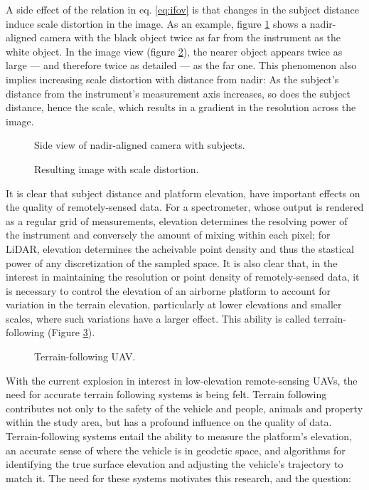 \documentclass[10pt,a4paper]{report}
\begin{document}
A side effect of the relation in eq. \ref{eq:ifov} is that changes in the subject distance induce scale distortion in the image. As an example, figure \ref{fig:scale_cam} shows a nadir-aligned camera with the black object twice as far from the instrument as the white object. In the image view (figure \ref{fig:scale_img}), the nearer object appears twice as large --- and therefore twice as detailed --- as the far one. This phenomenon also implies increasing scale distortion with distance from nadir: As the subject's distance from the instrument's measurement axis increases, so does the subject distance, hence the scale, which results in a gradient in the resolution across the image.

\begin{figure}
\centering
\def\svgscale{0.5}

\caption{Side view of nadir-aligned camera with subjects.}
\label{fig:scale_cam}
\end{figure}

\begin{figure}
\centering
\def\svgscale{0.5}

\caption{Resulting image with scale distortion.}
\label{fig:scale_img}
\end{figure}

It is clear that subject distance and platform elevation, have important effects on the quality of remotely-sensed data. For a spectrometer, whose output is rendered as a regular grid of measurements, elevation determines the resolving power of the instrument and conversely the amount of mixing within each pixel; for LiDAR, elevation determines the acheivable point density and thus the stastical power of any discretization of the sampled space. It is also clear that, in the interest in maintaining the resolution or point density of remotely-sensed data, it is necessary to control the elevation of an airborne platform to account for variation in the terrain elevation, particularly at lower elevations and smaller scales, where such variations have a larger effect. This ability is called terrain-following (Figure \ref{fig:uav_terrain}).

\begin{figure}
\centering
\def\svgscale{0.5}

\caption{Terrain-following UAV.}
\label{fig:uav_terrain}
\end{figure}

With the current explosion in interest in low-elevation remote-sensing UAVs, the need for accurate terrain following systems is being felt. Terrain following contributes not only to the safety of the vehicle and people, animals and property within the study area, but has a profound influence on the quality of data. Terrain-following systems entail the ability to measure the platform's elevation, an accurate sense of where the vehicle is in geodetic space, and algorithms for identifying the true surface elevation and adjusting the vehicle's trajectory to match it. The need for these systems motivates this research, and the question:
\end{document}
